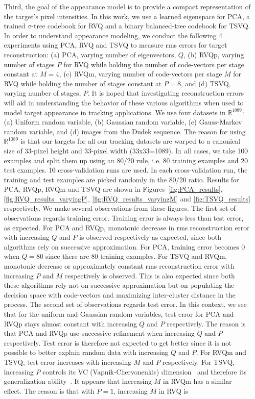\documentclass{article}
\begin{document}
Third, the goal of the appearance model is to provide a compact representation of the target's pixel intensities.  In this work, we use a learned eigenspace for PCA, a trained $\sigma$-tree codebook for RVQ and a binary balanced-tree codebook for TSVQ.  In order to understand appearance modeling, we conduct the following 4 experiments using PCA, RVQ and TSVQ to measure rms errors for target reconstruction: (a) PCA, varying number of eigenvectors, $Q$, (b) RVQp, varying number of stages $P$ for RVQ while holding the number of code-vectors per stage constant at $M=4$, (c) RVQm, varying number of code-vectors per stage $M$ for RVQ while holding the number of stages constant at $P=8$, and (d) TSVQ, varying number of stages, $P$.  It is hoped that investigating reconstruction errors will aid in understanding the behavior of these various algorithms when used to model target appearance in tracking applications.  We use four datasets in $\mathbb{R}^{1089}$: (a) Uniform random variable, (b) Gaussian random variable, (c) Gauss-Markov random variable, and (d) images from the Dudek sequence. The reason for using $\mathbb{R}^{1089}$ is that our targets for all our tracking datasets are warped to a canonical size of 33-pixel height and 33-pixel width (33x33=1089). In all cases, we take 100 examples and split them up using an 80/20 rule, i.e. 80 training examples and 20 test examples. 10 cross-validation runs are used. In each cross-validation run, the training and test examples are picked randomly in the 80/20 ratio.  Results for PCA, RVQp, RVQm and TSVQ are shown in Figures~\ref{fig:PCA_results}, \ref{fig:RVQ_results_varyingP}, \ref{fig:RVQ_results_varyingM} and \ref{fig:TSVQ_results} respectively.  We make several observations from these figures.  The first set of observations regards training error.  Training error is always less than test error, as expected.   For PCA and RVQp, monotonic decrease in rms reconstruction error with increasing $Q$ and $P$ is observed respectively as expected, since both algorithms rely on successive approximation. For PCA, training error becomes 0 when $Q=80$ since there are 80 training examples.  For TSVQ and RVQm, monotonic decrease or approximately constant rms reconstruction error with increasing $P$ and $M$ respectively is observed.  This is also expected since both these algorithms rely not on successive approximation but on populating the decision space with code-vectors and maximizing inter-cluster distance in the process.  The second set of observations regards test error.  In this context, we see that for the uniform and Gaussian random variables, test error for PCA and RVQp stays almost constant with increasing $Q$ and $P$ respectively.  The reason is that PCA and RVQp use successive refinement when increasing $Q$ and $P$ respectively.  Test error is therefore not expected to get better since it is not possible to better explain random data with increasing $Q$ and $P$.  For RVQm and TSVQ, test error increases with increasing $M$ and $P$ respectively.  For TSVQ, increasing $P$ controls its VC (Vapnik-Chervonenkis) dimension~\cite{1999_BOOK_PRML_Vapnik} and therefore its generalization ability~\cite{2003_JNL_PRML_Karacali}.  It appears that increasing $M$ in RVQm has a similar effect.  The reason is that with $P=1$, increasing $M$ in RVQ is 
\end{document}
